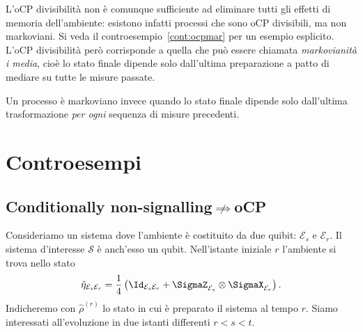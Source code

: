 \documentclass[a4]{article}
\begin{document}
L'oCP divisibilità non è comunque sufficiente ad eliminare tutti gli effetti di memoria
dell'ambiente: esistono infatti processi che sono oCP divisibili, ma non markoviani.
Si veda il controesempio~\ref{cont:ocpmar} per un esempio esplicito.
L'oCP divisibilità però corrisponde a quella che può essere chiamata \emph{markovianità
i media}, cioè lo stato finale dipende solo dall'ultima preparazione a patto di mediare
su tutte le misure passate.


Un processo è markoviano invece quando lo stato finale dipende solo dall'ultima trasformazione
\emph{per ogni} sequenza di misure precedenti.






\section{Controesempi}
\subsection[Cond. non-signalling does not imply oCP]
           {Conditionally non-signalling\(\centernot\implies\)oCP} \label{cont:cnsocp}
Consideriamo un sistema dove l'ambiente è costituito da due quibit: \(\mathcal{E}_s\) e
\(\mathcal{E}_r\). Il sistema d'interesse \(\mathcal{S}\) è anch'esso un qubit.
Nell'istante iniziale \(r\) l'ambiente si trova nello stato
\[\hat{\eta}_{\mathcal{E}_s\mathcal{E}_r} =
  \frac{1}{4}\left(\Id_{\mathcal{E}_s\mathcal{E}_r} +
                    \SigmaZ_{\mathcal{E}_s} \otimes \SigmaX_{\mathcal{E}_r}
             \right). \]
Indicheremo con \(\hat{\rho}^{(r)}\) lo stato in cui è preparato il sistema al tempo \(r\).
Siamo interessati all'evoluzione in due istanti differenti \(r<s<t\).
\end{document}
